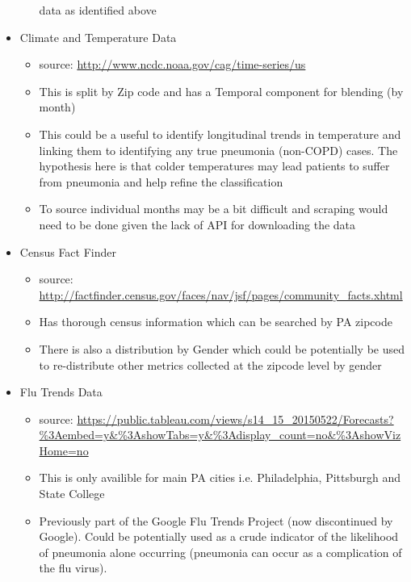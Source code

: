 \documentclass{article}
\begin{document}
\begin{itemize}
\begin{itemize}
          data as identified above
  \end{itemize}
  \item Climate and Temperature Data
  \begin{itemize}
    \item source: \url{http://www.ncdc.noaa.gov/cag/time-series/us}
    \item This is split by Zip code and has a Temporal component for blending (by month)
    \item This could be a useful to identify longitudinal trends in temperature
          and linking them to identifying any true pneumonia (non-COPD) cases. The 
          hypothesis here is that colder temperatures may lead patients to 
          suffer from pneumonia and help refine the classification
    \item To source individual months may be a bit difficult and scraping 
          would need to be done given the lack of API for downloading the data
  \end{itemize}
  \item Census Fact Finder
  \begin{itemize}
    \item source: \url{http://factfinder.census.gov/faces/nav/jsf/pages/community_facts.xhtml}
    \item Has thorough census information which can be searched by PA zipcode
    \item There is also a distribution by Gender which could be potentially be 
          used to re-distribute other metrics collected at the zipcode level by 
          gender
  \end{itemize}
  \item Flu Trends Data
  \begin{itemize}
    \item source: \url{https://public.tableau.com/views/s14_15_20150522/Forecasts?%3Aembed=y&%3AshowTabs=y&%3Adisplay_count=no&%3AshowVizHome=no}
    \item This is only availible for main PA cities i.e. Philadelphia, 
          Pittsburgh and State College
    \item Previously part of the Google Flu Trends Project (now discontinued by 
          Google). Could be potentially used as a crude indicator of the 
          likelihood of pneumonia alone occurring (pneumonia can occur as 
          a complication of the flu virus).
  \end{itemize}
\end{itemize}



\end{document}
